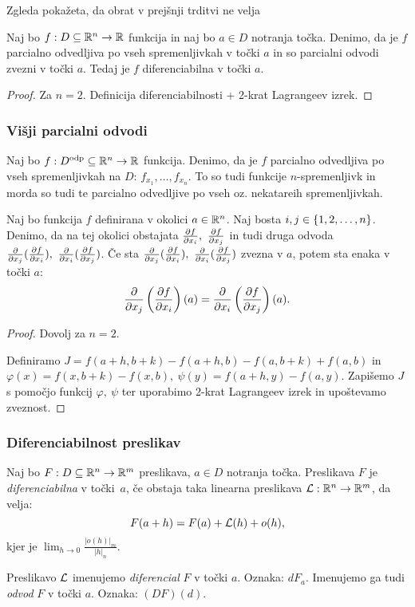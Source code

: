 \begin{opomba}
    Zgleda pokažeta, da obrat v prejšnji trditvi ne velja
\end{opomba}

\begin{izrek}
    Naj bo $f: D \subseteq \mathbb{R}^n \to \mathbb{R}$ funkcija in naj bo $a \in D$ notranja točka. Denimo, da je $f$ parcialno odvedljiva po vseh spremenljivkah v točki $a$ in so parcialni odvodi zvezni v točki $a$. Tedaj je $f$ diferenciabilna v točki $a$.
\end{izrek}

\begin{proof}
    Za $n=2$. Definicija diferenciabilnosti + 2-krat Lagrangeev izrek.
\end{proof}

\subsubsection{Višji parcialni odvodi}
Naj bo $f: D^{\text{odp}} \subseteq \mathbb{R}^n \to \mathbb{R}$ funkcija. Denimo, da je $f$ parcialno odvedljiva po vseh spremenljivkah na $D$: $f_{x_1}, \ldots, f_{x_n}$. To so tudi funkcije $n$-spremenljivk in morda so tudi te parcialno odvedljive po vseh oz. nekatareih spremenljivkah.

\begin{trditev}
    Naj bo funkcija $f$ definirana v okolici $a \in \mathbb{R}^n$. Naj bosta $i, j \in \left\{1, 2, \ldots, n\right\}$. Denimo, da na tej okolici obstajata $\frac{\partial f}{\partial x_i}, \ \frac{\partial f}{\partial x_j}$ in tudi druga odvoda $\frac{\partial}{\partial x_j} (\podv{f}{x_i}), \ \frac{\partial}{\partial x_i} (\podv{f}{x_j})$. Če sta $\frac{\partial}{\partial x_j} (\podv{f}{x_i}), \ \frac{\partial}{\partial x_i} (\podv{f}{x_j})$ zvezna v $a$, potem sta enaka v točki $a$: 
    $$\frac{\partial}{\partial x_j} \left(\frac{\partial f}{\partial x_i}\right)(a) = \frac{\partial}{\partial x_i} \left(\frac{\partial f}{\partial x_j}\right)(a).$$
\end{trditev}

\begin{proof}
    Dovolj za $n=2$. 
    
    Definiramo $J = f(a+h, b+k) - f(a+h, b) - f(a, b+k) + f(a,b)$ in $\varphi(x) = f(x, b+k) - f(x, b), \ \psi(y) = f(a+h, y) - f(a, y)$. Zapišemo $J$ s pomočjo funkcij $\varphi, \ \psi$ ter uporabimo 2-krat Lagrangeev izrek in upoštevamo zveznost.
\end{proof}

\subsubsection{Diferenciabilnost preslikav}
\begin{definicija}
    Naj bo $F: D \subseteq \mathbb{R}^n \to \mathbb{R}^m$ preslikava, $a \in D$ notranja točka. Preslikava $F$ je \emph{diferenciabilna} v točki~$a$, če obstaja taka linearna preslikava $\mathcal{L}: \mathbb{R}^n \to \mathbb{R}^m$, da velja:
    $$F(a+h) = F(a) + \mathcal{L}(h) + o(h),$$
    kjer je $\lim_{h \to 0} \frac{|o(h)|_m}{|h|_n}$. 

    Preslikavo $\mathcal{L}$ imenujemo \emph{diferencial} $F$ v točki $a$. Oznaka: $dF_a$. Imenujemo ga tudi \emph{odvod} $F$ v točki $a$. Oznaka: $(DF)(d)$.
\end{definicija}

